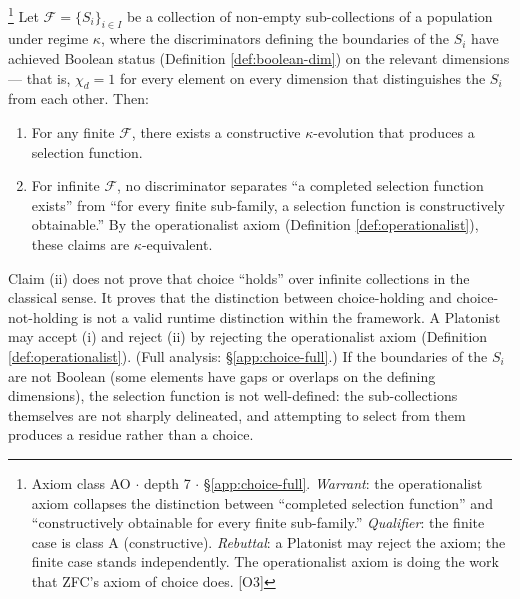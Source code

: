 \begin{theorem}\label{thm:choice}\footnote{Axiom class \textsf{AO} $\cdot$ depth 7 $\cdot$ \S\ref{app:choice-full}.  \emph{Warrant}: the operationalist axiom collapses the distinction between ``completed selection function'' and ``constructively obtainable for every finite sub-family.'' \emph{Qualifier}: the finite case is class \textsf{A} (constructive). \emph{Rebuttal}: a Platonist may reject the axiom; the finite case stands independently. The operationalist axiom is doing the work that ZFC's axiom of choice does. [O3]}
Let $\mathcal{F} = \{S_i\}_{i \in I}$ be a collection of
non-empty sub-collections of a population under regime
$\kappa$, where the discriminators defining the boundaries
of the $S_i$ have achieved Boolean status
(Definition \ref{def:boolean-dim}) on the relevant
dimensions --- that is, $\chi_d = 1$ for every element
on every dimension that distinguishes the $S_i$ from
each other. Then:
\begin{enumerate}[label=(\roman*),nosep]
  \item For any finite $\mathcal{F}$, there exists a
    constructive $\kappa$-evolution that produces a
    selection function.
  \item For infinite $\mathcal{F}$, no discriminator
    separates ``a completed selection function exists''
    from ``for every finite sub-family, a selection
    function is constructively obtainable.'' By the
    operationalist axiom (Definition
    \ref{def:operationalist}), these claims are
    $\kappa$-equivalent.
\end{enumerate}
Claim (ii) does not prove that choice ``holds'' over
infinite collections in the classical sense. It proves
that the distinction between choice-holding and
choice-not-holding is not a valid runtime distinction
within the framework. A Platonist may accept (i) and
reject (ii) by rejecting the operationalist axiom (Definition \ref{def:operationalist}). (Full analysis: \S\ref{app:choice-full}.)
If the boundaries of the $S_i$ are not Boolean (some
elements have gaps or overlaps on the defining dimensions),
the selection function is not well-defined: the sub-collections
themselves are not sharply delineated, and attempting to
select from them produces a residue rather than a choice.
\end{theorem}

